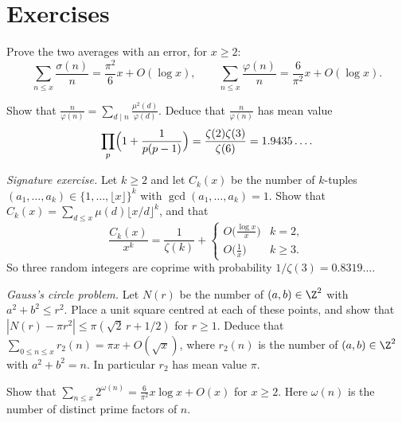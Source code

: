 \section{Exercises}

\begin{exercise}[$\star$]\label{ex:sigmaovern}
Prove the two averages with an error, for $x\ge2$:
\[
\sum_{n\le x}\frac{\sigma(n)}n=\frac{\pi^2}6x+O(\log x),\qquad\sum_{n\le x}\frac{\varphi(n)}n=\frac6{\pi^2}x+O(\log x).
\]
\end{exercise}

\begin{exercise}[$\star\star$]\label{ex:nphi}
Show that $\frac n{\varphi(n)}=\sum_{d\mid n}\frac{\mu^2(d)}{\varphi(d)}$. Deduce that $\frac n{\varphi(n)}$ has mean value
\[
\prod_p\Bigl(1+\frac1{p(p-1)}\Bigr)=\frac{\zeta(2)\zeta(3)}{\zeta(6)}=1.9435\ldots.
\]
\end{exercise}

\begin{exercise}[$\star\star$]\label{ex:coprimek}
\emph{Signature exercise.} Let $k\ge2$ and let $C_k(x)$ be the number of $k$-tuples $(a_1,\dots,a_k)\in\{1,\dots,\lfloor x\rfloor\}^k$ with $\gcd(a_1,\dots,a_k)=1$. Show that $C_k(x)=\sum_{d\le x}\mu(d)\lfloor x/d\rfloor^k$, and that
\[
\frac{C_k(x)}{x^k}=\frac1{\zeta(k)}+\begin{cases}O\bigl(\frac{\log x}x\bigr)&k=2,\\O\bigl(\frac1x\bigr)&k\ge3.\end{cases}
\]
So three random integers are coprime with probability $1/\zeta(3)=0.8319\ldots$.
\end{exercise}

\begin{exercise}[$\star\star$]\label{ex:circle}
\emph{Gauss's circle problem.} Let $N(r)$ be the number of $(a,b)\in\Z^2$ with $a^2+b^2\le r^2$. Place a unit square centred at each of these points, and show that $|N(r)-\pi r^2|\le\pi(\sqrt2\,r+1/2)$ for $r\ge1$. Deduce that $\sum_{0\le n\le x}r_2(n)=\pi x+O(\sqrt x)$, where $r_2(n)$ is the number of $(a,b)\in\Z^2$ with $a^2+b^2=n$. In particular $r_2$ has mean value $\pi$.
\end{exercise}

\begin{exercise}[$\star\star$]\label{ex:twoomega}
Show that $\sum_{n\le x}2^{\omega(n)}=\frac6{\pi^2}x\log x+O(x)$ for $x\ge2$. Here $\omega(n)$ is the number of distinct prime factors of $n$.
\end{exercise}


